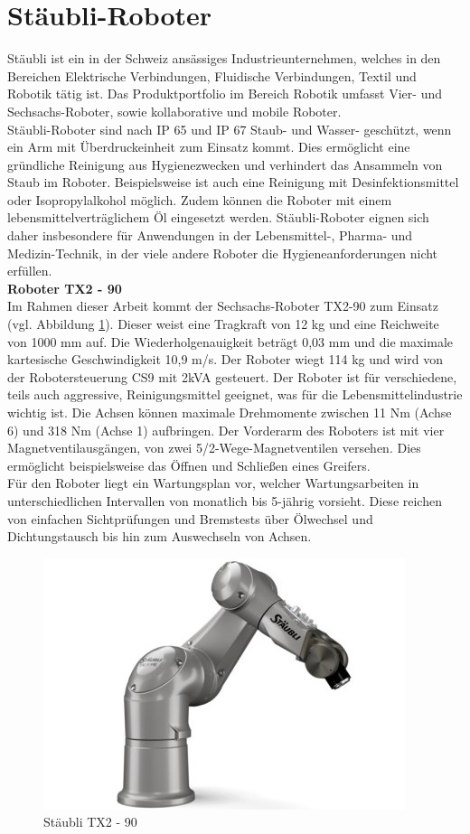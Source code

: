 \documentclass[ a4paper,
                oneside,
                toc=bibliography,
                toc=listof
                ]{scrbook}
\begin{document}
   	\section{Stäubli-Roboter}
   	Stäubli ist ein in der Schweiz ansässiges Industrieunternehmen, welches in den Bereichen \glqq Elektrische Verbindungen\grqq, \glqq Fluidische Verbindungen\grqq, \glqq Textil\grqq{} und \glqq Robotik\grqq{} tätig ist. Das Produktportfolio im Bereich Robotik umfasst Vier- und Sechsachs-Roboter, sowie kollaborative und mobile Roboter. \cite{StaubliUberUns}\\ Stäubli-Roboter sind nach IP 65 und IP 67 Staub- und Wasser- geschützt, wenn ein Arm mit Überdruckeinheit zum Einsatz kommt. Dies ermöglicht eine gründliche Reinigung aus Hygienezwecken und verhindert das Ansammeln von Staub im Roboter. Beispielsweise ist auch eine Reinigung mit Desinfektionsmittel oder Isopropylalkohol möglich. Zudem können die Roboter mit einem lebensmittelverträglichem Öl eingesetzt werden. Stäubli-Roboter eignen sich daher insbesondere für Anwendungen in der Lebensmittel-, Pharma- und Medizin-Technik, in der viele andere Roboter die Hygieneanforderungen nicht erfüllen. \cite{StaubliProduktubersicht} \vspace{0.5\baselineskip}\\
   	\textbf{Roboter TX2 - 90}\\
   	Im Rahmen dieser Arbeit kommt der Sechsachs-Roboter TX2-90 zum Einsatz (vgl. Abbildung \ref{fig:TX90}). Dieser weist eine Tragkraft von 12 kg und eine Reichweite von 1000 mm auf. Die Wiederholgenauigkeit beträgt 0,03 mm und die maximale kartesische Geschwindigkeit 10,9 m/s. Der Roboter wiegt 114 kg und wird von der Robotersteuerung CS9 mit 2kVA gesteuert. Der Roboter ist für verschiedene, teils auch aggressive, Reinigungsmittel geeignet, was für die Lebensmittelindustrie wichtig ist. Die Achsen können maximale Drehmomente zwischen 11 Nm (Achse 6) und 318 Nm (Achse 1) aufbringen. Der Vorderarm des Roboters ist mit vier Magnetventilausgängen, von zwei 5/2-Wege-Magnetventilen versehen. Dies ermöglicht beispielsweise das Öffnen und Schließen eines Greifers.\\
   	Für den Roboter liegt ein Wartungsplan vor, welcher Wartungsarbeiten in unterschiedlichen Intervallen von monatlich bis 5-jährig vorsieht. Diese reichen von einfachen Sichtprüfungen und Bremstests über Ölwechsel und Dichtungstausch bis hin zum Auswechseln von Achsen. \cite{X90}
   	\begin{figure}[h]
   		\centering
   		\includegraphics[width=0.50\linewidth]{./images/Staubli_HE.png}
   		\caption{Stäubli TX2 - 90 \cite{Staubli_HE}} 
   		\label{fig:TX90}
   	\end{figure}
\end{document}
